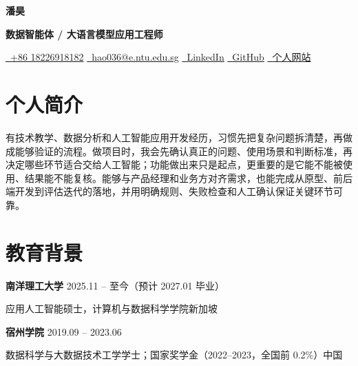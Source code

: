 \documentclass[a4paper,10pt]{article}
\newcommand{\resumeEntry}[4]{%
  {\fontsize{10.3}{12.1}\selectfont\bfseries #1}%
  \hfill{\fontsize{9.1}{11.1}\selectfont\color{muted}#2}\par
  {\fontsize{9.2}{11.3}\selectfont\color{muted}#3\hfill#4}\par\vspace{-0.5pt}
}
\newcommand{\contactsep}{\enspace{\color{rule}\textbar}\enspace}
\begin{document}
\color{ink}

\begin{center}
  {\fontsize{24}{26}\selectfont\bfseries\color{accent} 潘昊}\par
  \vspace{1pt}
  {\fontsize{10.8}{12.5}\selectfont\bfseries 数据智能体 / 大语言模型应用工程师}\par
  \vspace{2pt}
  \small
  \href{tel:+8618226918182}{\faPhone\ +86 18226918182}
  \contactsep
  \href{mailto:hao036@e.ntu.edu.sg}{\faEnvelope\ \underline{hao036@e.ntu.edu.sg}}
  \contactsep
  \href{https://www.linkedin.com/in/hao-pan-59193937a/}{\faLinkedin\ \underline{LinkedIn}}
  \contactsep
  \href{https://github.com/HaoPan036}{\faGithub\ \underline{GitHub}}
  \contactsep
  \href{https://haopan036.github.io/}{\faGlobe\ \underline{个人网站}}
\end{center}
\vspace{-4pt}

\section{个人简介}
有技术教学、数据分析和人工智能应用开发经历，习惯先把复杂问题拆清楚，再做成能够验证的流程。做项目时，我会先确认真正的问题、使用场景和判断标准，再决定哪些环节适合交给人工智能；功能做出来只是起点，更重要的是它能不能被使用、结果能不能复核。能够与产品经理和业务方对齐需求，也能完成从原型、前后端开发到评估迭代的落地，并用明确规则、失败检查和人工确认保证关键环节可靠。

\section{教育背景}
\resumeEntry
  {南洋理工大学}
  {2025.11 -- 至今（预计 2027.01 毕业）}
  {应用人工智能硕士，计算机与数据科学学院}
  {新加坡}
\resumeEntry
  {宿州学院}
  {2019.09 -- 2023.06}
  {数据科学与大数据技术工学学士；国家奖学金（2022--2023，全国前 0.2\%）}
  {中国}
\end{document}
